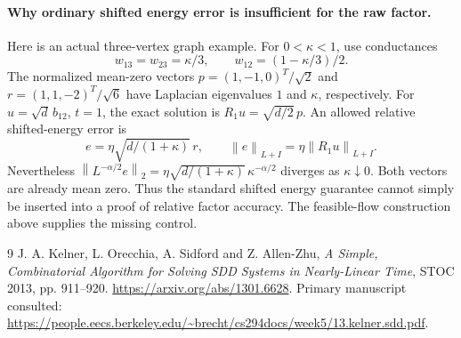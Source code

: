 \documentclass[11pt]{article}
\newcommand{\norm}[1]{\left\lVert #1\right\rVert}
\begin{document}
\paragraph{Why ordinary shifted energy error is insufficient for the
raw factor.}
Here is an actual three-vertex graph example. For $0<\kappa<1$, use
conductances
\[
 w_{13}=w_{23}=\kappa/3,\qquad
 w_{12}=(1-\kappa/3)/2.
\]
The normalized mean-zero vectors
$p=(1,-1,0)^T/\sqrt2$ and $r=(1,1,-2)^T/\sqrt6$ have Laplacian
eigenvalues $1$ and $\kappa$, respectively. For $u=\sqrt d\,b_{12}$,
$t=1$, the exact solution is $R_1u=\sqrt{d/2}\,p$.
An allowed relative shifted-energy error is
\[
 e=\eta\sqrt{d/(1+\kappa)}\,r,
 \qquad \norm e_{L+I}=\eta\norm{R_1u}_{L+I}.
\]
Nevertheless
$\norm{L^{-\alpha/2}e}_2
=\eta\sqrt{d/(1+\kappa)}\,\kappa^{-\alpha/2}$ diverges as
$\kappa\downarrow0$. Both vectors are already mean zero.
Thus the standard shifted energy guarantee cannot simply be inserted
into a proof of relative factor accuracy. The feasible-flow construction
above supplies the missing control.

\begin{thebibliography}{9}
J. A. Kelner, L. Orecchia, A. Sidford and Z. Allen-Zhu,
\emph{A Simple, Combinatorial Algorithm for Solving SDD Systems in
Nearly-Linear Time}, STOC 2013, pp. 911--920.
\url{https://arxiv.org/abs/1301.6628}.
Primary manuscript consulted:
\url{https://people.eecs.berkeley.edu/~brecht/cs294docs/week5/13.kelner.sdd.pdf}.
\end{thebibliography}
\end{document}
